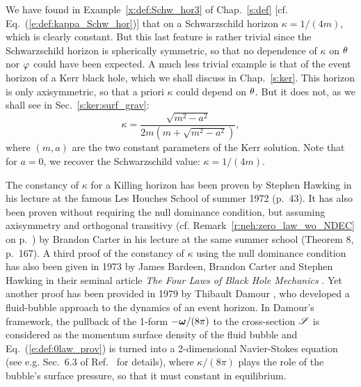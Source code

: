 \begin{example}
\label{x:neh:Schw_Kerr_kappa}
We have found in Example~\ref{x:def:Schw_hor3} of Chap.~\ref{s:def} [cf. Eq.~(\ref{e:def:kappa_Schw_hor})]
that on a Schwarzschild horizon $\kappa = 1/(4m)$,
which is clearly constant. But
this last feature is rather trivial since the Schwarzschild horizon is spherically
symmetric, so that no dependence of $\kappa$ on $\theta$ nor $\varphi$ could have been expected.
A much less trivial example is that of the event horizon of a Kerr black hole,
which we shall discuss in Chap.~\ref{s:ker}. This horizon is only axisymmetric,
so that a priori $\kappa$ could depend on $\theta$. But it does not, as we shall
see in Sec.~\ref{s:ker:surf_grav}:
\[
    \kappa = \frac{\sqrt{m^2 - a^2}}{2m(m + \sqrt{m^2-a^2})} ,
\]
where $(m,a)$ are the two constant parameters of the Kerr solution. Note that for $a=0$,
we recover the Schwarzschild value: $\kappa= 1/(4m)$.
\end{example}

\begin{hist}
The constancy of $\kappa$ for a Killing horizon has been proven by Stephen Hawking
in his lecture at the famous Les Houches School of summer 1972 \cite{Hawki73} (p.~43).
It has also been proven without requiring the null dominance condition, but
assuming axisymmetry and orthogonal transitivy (cf. Remark~\ref{r:neh:zero_law_wo_NDEC} on p.~\pageref{r:neh:zero_law_wo_NDEC}) by Brandon Carter in his lecture at the same summer
school
\cite{Carte73b} (Theorem 8, p.~167).
A third proof of the constancy of $\kappa$ using the null dominance condition
has also been given in 1973 by James Bardeen, Brandon Carter and
Stephen Hawking
in their seminal article \emph{The Four Laws of Black Hole Mechanics}
\cite{BardeCH73}. Yet another proof has been provided in 1979 by Thibault Damour
\cite{Damou79,Damou82}, who developed a fluid-bubble approach to the dynamics of an event horizon.
In Damour's framework, the pullback of the 1-form  $-\bm{\omega}/(8\pi)$ to the cross-section
$\mathscr{S}$ is considered as the momentum surface density of the fluid bubble and Eq.~(\ref{e:def:0law_prov})
is turned into a 2-dimensional Navier-Stokes equation (see e.g. Sec.~6.3 of Ref.~\cite{GourgJ06} for details), where $\kappa/(8\pi)$ plays the role of the
bubble's surface pressure, so that it must constant in equilibrium.
\end{hist}

